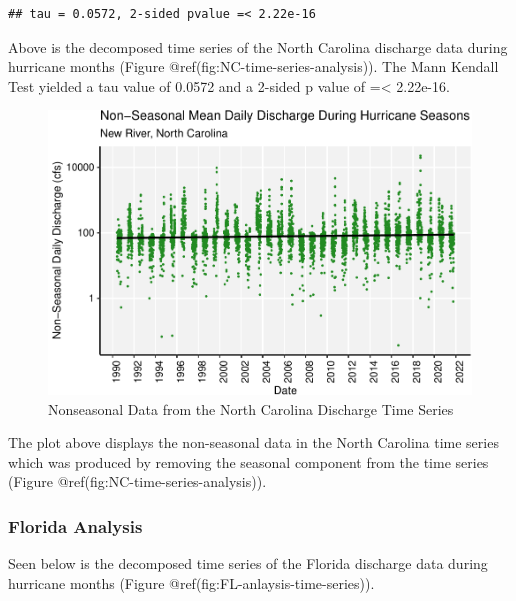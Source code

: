 \documentclass[
  12pt,
]{article}
\begin{document}
\begin{verbatim}
## tau = 0.0572, 2-sided pvalue =< 2.22e-16
\end{verbatim}

Above is the decomposed time series of the North Carolina discharge data
during hurricane months (Figure @ref(fig:NC-time-series-analysis)). The
Mann Kendall Test yielded a tau value of 0.0572 and a 2-sided p value of
=\textless{} 2.22e-16.

\begin{figure}

{\centering \includegraphics{BoosBrantleyHusted_ENV872_Project_files/figure-latex/NC-time-series-analysis-cont-1} 

}

\caption{Nonseasonal Data from the North Carolina Discharge Time Series}\label{fig:NC-time-series-analysis-cont}
\end{figure}

The plot above displays the non-seasonal data in the North Carolina time
series which was produced by removing the seasonal component from the
time series (Figure @ref(fig:NC-time-series-analysis)).

\hypertarget{florida-analysis}{%
\subsubsection{Florida Analysis}\label{florida-analysis}}

Seen below is the decomposed time series of the Florida discharge data
during hurricane months (Figure @ref(fig:FL-anlaysis-time-series)).
\end{document}
